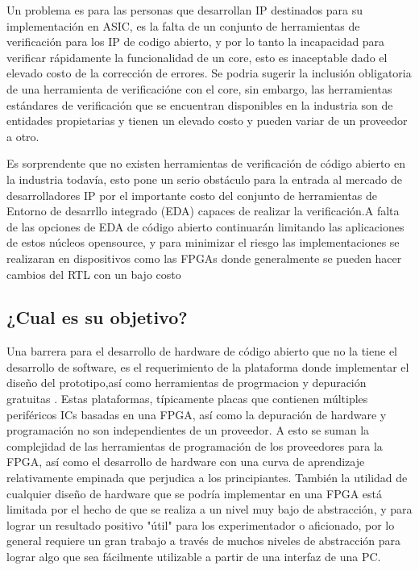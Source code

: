 Un problema es para las personas que desarrollan IP destinados para su implementación en ASIC, es la falta de un conjunto de herramientas de verificación para los IP de codigo abierto, y por lo tanto la incapacidad para verificar rápidamente la funcionalidad de un core, esto es inaceptable dado el elevado costo de la corrección de errores. Se podria sugerir la inclusión obligatoria de una herramienta de verificacióne con el core, sin embargo, las herramientas estándares de verificación que se encuentran disponibles en la industria son de entidades propietarias y tienen un elevado costo y pueden variar de un proveedor a otro. 

Es sorprendente que no existen herramientas de verificación de código abierto en la industria todavía, esto pone un serio obstáculo para la entrada al mercado de desarrolladores IP por el importante costo del conjunto de herramientas de Entorno de desarrllo integrado (EDA) capaces de realizar la verificación.A falta de las opciones de EDA de código abierto continuarán limitando las aplicaciones de estos núcleos opensource, y para minimizar el riesgo las implementaciones se realizaran en dispositivos como las FPGAs donde generalmente se pueden hacer cambios  del RTL con un bajo costo 
 

	\subsection{¿Cual es su objetivo? }


Una barrera para el desarrollo de hardware de código abierto que no la tiene el desarrollo de software, es el requerimiento de la plataforma donde implementar el diseño del prototipo,así como herramientas  de progrmacion y depuración gratuitas . Estas plataformas, típicamente placas que contienen múltiples periféricos ICs basadas en una FPGA, así como la depuración de hardware y programación no son independientes de un proveedor. A esto se suman la complejidad de las herramientas de programación de los proveedores para la FPGA, así como el desarrollo de hardware con una curva de aprendizaje relativamente empinada que perjudica a los principiantes.
También  la utilidad de cualquier diseño de hardware que se podría implementar en una FPGA está limitada por el hecho de que se realiza a un nivel muy bajo de abstracción, y para lograr un resultado positivo "útil" para los experimentador o aficionado, por lo general requiere un gran trabajo a través de muchos niveles de abstracción para lograr algo que sea fácilmente utilizable a partir de una interfaz de una PC. 


